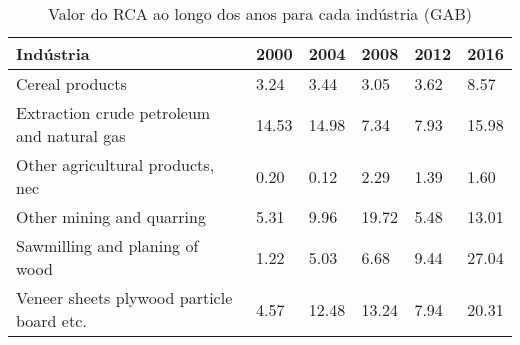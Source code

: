 \begin{table}
\centering
\caption{Valor do RCA ao longo dos anos para cada indústria (GAB)}
\label{tab:ex3-tempo-GAB}
\begin{tabular}{p{6cm}p{1.5cm}p{1.5cm}p{1.5cm}p{1.5cm}p{1.5cm}}
\toprule
                                 Indústria &  2000 &  2004 &  2008 & 2012 &  2016 \\
\midrule
                           Cereal products &  3.24 &  3.44 &  3.05 & 3.62 &  8.57 \\
Extraction crude petroleum and natural gas & 14.53 & 14.98 &  7.34 & 7.93 & 15.98 \\
          Other agricultural products, nec &  0.20 &  0.12 &  2.29 & 1.39 &  1.60 \\
                 Other mining and quarring &  5.31 &  9.96 & 19.72 & 5.48 & 13.01 \\
            Sawmilling and planing of wood &  1.22 &  5.03 &  6.68 & 9.44 & 27.04 \\
 Veneer sheets plywood particle board etc. &  4.57 & 12.48 & 13.24 & 7.94 & 20.31 \\
\bottomrule
\end{tabular}
\end{table}
